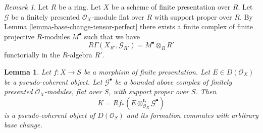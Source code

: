 \documentclass{stacks-project}
\theoremstyle{plain}
\newtheorem{lemma}[subsection]{Lemma}
\theoremstyle{definition}
\theoremstyle{remark}
\newtheorem{remark}[subsection]{Remark}
\numberwithin{equation}{subsection}
\begin{document}
\begin{remark}
\label{remark-explain-perfect-direct-image}
Let $R$ be a ring. Let $X$ be a scheme of finite presentation over
$R$. Let $\mathcal{G}$ be a finitely presented $\mathcal{O}_X$-module
flat over $R$ with support proper over $R$. By
Lemma \ref{lemma-base-change-tensor-perfect}
there exists a finite complex of finite projective $R$-modules
$M^\bullet$ such that we have
$$
R\Gamma(X_{R'}, \mathcal{G}_{R'}) = M^\bullet \otimes_R R'
$$
functorially in the $R$-algebra $R'$.
\end{remark}

\begin{lemma}
\label{lemma-base-change-tensor-pseudo-coherent}
Let $f : X \to S$ be a morphism of finite presentation.
Let $E \in D(\mathcal{O}_X)$ be a pseudo-coherent object.
Let $\mathcal{G}^\bullet$ be a bounded above complex of
finitely presented $\mathcal{O}_X$-modules, flat over $S$,
with support proper over $S$. Then
$$
K = Rf_*(E \otimes_{\mathcal{O}_X}^\mathbf{L} \mathcal{G}^\bullet)
$$
is a pseudo-coherent object of $D(\mathcal{O}_S)$ and its formation
commutes with arbitrary base change.
\end{lemma}
\end{document}
